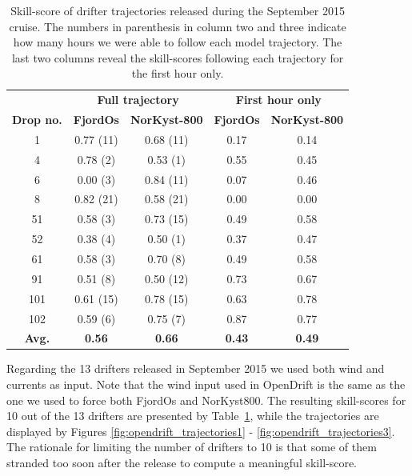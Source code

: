 \begin{table}[htb]
  \begin{center}
    \begin{tabular}{ | c | c | c | c | c |}
    \hline
		& \multicolumn{2}{|c|}{\bf \small{Full trajectory}}  & \multicolumn{2}{|c|}{\bf \small{First hour only}} \\ 
   {\bf \small Drop no.} & {\bf \small FjordOs} & {\bf \small NorKyst-800} & {\bf \small FjordOs} & {\bf \small NorKyst-800}\\ \hline
{\small	1}	& {\small 0.77 (11)}	& {\small 0.68 (11)}	& {\small 0.17}	& {\small 0.14} \\ 
{\small	4}	& {\small 0.78 (2)}	& {\small 0.53 (1)}	& {\small 0.55}	& {\small 0.45} \\
{\small	6}	& {\small 0.00 (3)}	& {\small 0.84 (11)}	& {\small 0.07}	& {\small 0.46} \\
{\small	8}	& {\small 0.82 (21)}	& {\small 0.58 (21)}	& {\small 0.00}	& {\small 0.00} \\
{\small	51}	& {\small 0.58 (3)}	& {\small 0.73 (15)}	& {\small 0.49}	& {\small 0.58} \\
{\small	52}	& {\small 0.38 (4)}	& {\small 0.50 (1)}	& {\small 0.37}	& {\small 0.47} \\
{\small	61}	& {\small 0.58 (3)}	& {\small 0.70 (8)}	& {\small 0.49}	& {\small 0.58} \\
{\small	91}	& {\small 0.51 (8)}	& {\small 0.50 (12)}	& {\small 0.73}	& {\small 0.67} \\
{\small	101}	& {\small 0.61 (15)}	& {\small 0.78 (15)}	& {\small 0.63}	& {\small 0.78} \\
{\small	102}	& {\small 0.59 (6)}	& {\small 0.75 (7)}	& {\small 0.87}	& {\small 0.77} \\ \hline
{\bf\small Avg.}& {\bf\small 0.56}	& {\bf \small 0.66}	& {\bf \small 0.43}	& {\bf \small 0.49}\\
    \hline
    \end{tabular}
    \caption{\small Skill-score of drifter trajectories released during the September 2015 cruise. The numbers in parenthesis in column two and three indicate how many hours we were able to follow each model trajectory. The last two columns reveal the skill-scores following each trajectory for the first hour only.}
    \label{tab:skillscore_full}
  \end{center}
\end{table}

Regarding the 13 drifters released in September 2015 we used both wind and currents as input. Note that the wind input used in OpenDrift is the same as the one we used to force both FjordOs and NorKyst800. The resulting skill-scores for 10 out of the 13 drifters are presented by Table~\ref{tab:skillscore_full}, while the trajectories are displayed by Figures \ref{fig:opendrift_trajectories1} - \ref{fig:opendrift_trajectories3}. The rationale for limiting the number of drifters to 10 is that some of them stranded too soon after the release to compute a meaningful skill-score. 

